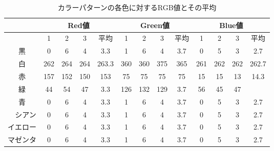 \documentclass{jarticle}
\begin{document}
\begin{table}[H]
\caption{カラーパターンの各色に対するRGB値とその平均}
	\begin{center}
		\begin{tabular}{|c|c|c|c|c|c|c|c|c|c|c|c|c|}\hline 
		& \multicolumn{4}{c|}{Red値} & \multicolumn{4}{c|}{Green値} & \multicolumn{4}{c|}{Blue値} \\ \hline
			& 1 & 2 & 3 &平均& 1 & 2 & 3 &平均& 1 & 2 & 3 &平均 \\ \hline
		黒 & 0 & 6 & 4 & 3.3& 1 & 6 & 4 & 3.7& 0 & 5 & 3 & 2.7 \\ \hline
		白 &262&264&264&263.3&360&360&375&365&261&262&262&262.7 \\ \hline
		赤 &157&152&150& 153 &75 &75 & 75& 75& 15& 15& 13& 14.3 \\ \hline
		緑 & 44& 54 &47& 3.3 &126&132&129& 3.7& 56&45& 47&  \\ \hline
		青 & 0 & 6 & 4 & 3.3& 1 & 6 & 4 & 3.7& 0 & 5 & 3 & 2.7 \\ \hline
　シアン & 0 & 6 & 4 & 3.3& 1 & 6 & 4 & 3.7& 0 & 5 & 3 & 2.7 \\ \hline
 イエロー& 0 & 6 & 4 & 3.3& 1 & 6 & 4 & 3.7& 0 & 5 & 3 & 2.7 \\ \hline
 マゼンタ& 0 & 6 & 4 & 3.3& 1 & 6 & 4 & 3.7& 0 & 5 & 3 & 2.7 \\ \hline
		\end{tabular}
	\end{center}
\label{table:enshu8-2-5} 
\end{table}
\end{document}
